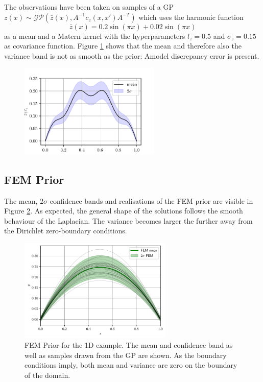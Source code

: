 \documentclass[%
  a4paper,oneside,%
  11pt,%
  smallchapters,
  style=printdev,
  extramargin,
  green,%
  rgb, <cmyk>
  ]{tubsbook}
\begin{document}
The observations have been taken on samples of a GP $z(x) \sim \mathcal{GP}(\bar{z}(x),A^{-1}c_z(x,x')A^{-T})$ which uses the harmonic function
\begin{equation}
\bar{z}(x) = 0.2\sin(\pi x) + 0.02\sin(\pi x)
\end{equation}
as a mean and a Matern kernel with the hyperparameters $l_z=0.5$ and $\sigma_z = 0.15$ as covariance function. Figure \ref{fig:zGP} shows that the mean and therefore also the variance band is not as smooth as the prior: Amodel discrepancy error is present.
\begin{figure}[!ht]
\includegraphics[width=0.6\textwidth]{pics/z_GP.pdf}
\centering
\caption{}
\label{fig:zGP}
\end{figure}
%


\subsection{FEM Prior}
The mean, $2\sigma$ confidence bands and realisations of the FEM prior are visible in Figure \ref{fig:FEMGP1D}. As expected, the general shape of the solutions follows the smooth behaviour of the Laplacian. The variance becomes larger the further away from the Dirichlet zero-boundary conditions.
\begin{figure}[!ht]
\includegraphics[width=0.65\textwidth]{pics/1DFEMprior.pdf}
\centering
\caption{FEM Prior for the 1D example. The mean and confidence band as well as samples drawn from the GP are shown. As the boundary conditions imply, both mean and variance are zero on the boundary of the domain.}
\label{fig:FEMGP1D}
\end{figure}
\end{document}
